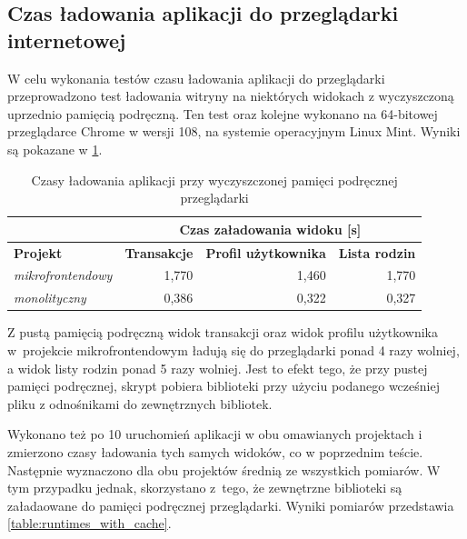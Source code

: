 \documentclass{SGGW-thesis}
\begin{document}
    \subsection{Czas ładowania aplikacji do przeglądarki internetowej}
    W celu wykonania testów czasu ładowania aplikacji do przeglądarki przeprowadzono test ładowania witryny na niektórych widokach z wyczyszczoną uprzednio pamięcią podręczną. Ten test oraz kolejne wykonano na 64-bitowej przeglądarce Chrome w wersji 108, na systemie operacyjnym Linux Mint. Wyniki są pokazane w \cref{table:runtimes_without_cache}.

    \begin{table}[h]
      \centering
      \caption{Czasy ładowania aplikacji przy wyczyszczonej pamięci podręcznej przeglądarki}
      \begin{tabular}{l|rrr|}
      \cline{2-4}
       & \multicolumn{3}{c|}{\textbf{Czas załadowania widoku {[}s{]}}} \\ \hline
      \multicolumn{1}{|l|}{\textbf{Projekt}} & \multicolumn{1}{l|}{\textbf{Transakcje}} & \multicolumn{1}{l|}{\textbf{Profil użytkownika}} & \multicolumn{1}{l|}{\textbf{Lista rodzin}} \\ \hline
      \multicolumn{1}{|l|}{\textit{mikrofrontendowy}} & \multicolumn{1}{r|}{1,770} & \multicolumn{1}{r|}{1,460} & 1,770 \\ \hline
      \multicolumn{1}{|l|}{\textit{monolityczny}} & \multicolumn{1}{r|}{0,386} & \multicolumn{1}{r|}{0,322} & 0,327 \\ \hline
      \end{tabular}
      \label{table:runtimes_without_cache}
    \end{table}

    Z pustą pamięcią podręczną widok transakcji oraz widok profilu użytkownika w~projekcie mikrofrontendowym ładują się do przeglądarki ponad 4 razy wolniej, a widok listy rodzin ponad 5 razy wolniej. Jest to efekt tego, że przy pustej pamięci podręcznej, skrypt pobiera biblioteki przy użyciu podanego wcześniej pliku z odnośnikami do zewnętrznych bibliotek.

    Wykonano też po 10 uruchomień aplikacji w obu omawianych projektach i zmierzono czasy ładowania tych samych widoków, co w poprzednim teście. Następnie wyznaczono dla obu projektów średnią ze wszystkich pomiarów. W tym przypadku jednak, skorzystano z~tego, że zewnętrzne biblioteki są załadaowane do pamięci podręcznej przeglądarki. Wyniki pomiarów przedstawia \cref{table:runtimes_with_cache}.
    
\end{document}
